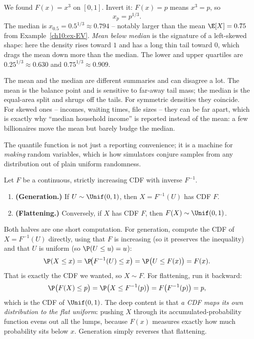 \begin{example}[Quantiles of $f=3x^2$]
\label{ch10:ex-quantile}
We found $F(x) = x^3$ on $[0,1]$. Invert it: $F(x)=p$ means $x^3 = p$, so
\[
  x_p = p^{1/3}.
\]
The median is $x_{0.5} = 0.5^{1/3} \approx 0.794$ -- notably larger than the mean
$\E[X]=0.75$ from Example~\ref{ch10:ex-EV}. \emph{Mean below median} is the signature
of a left-skewed shape: here the density rises toward $1$ and has a long thin tail
toward $0$, which drags the mean down more than the median. The lower and upper
quartiles are $0.25^{1/3}\approx 0.630$ and $0.75^{1/3}\approx 0.909$.
\end{example}

\begin{trapbox}
The mean and the median are different summaries and can disagree a lot. The mean is
the balance point and is sensitive to far-away tail mass; the median is the
equal-area split and shrugs off the tails. For symmetric densities they coincide.
For skewed ones -- incomes, waiting times, file sizes -- they can be far apart, which
is exactly why ``median household income'' is reported instead of the mean: a few
billionaires move the mean but barely budge the median.
\end{trapbox}

The quantile function is not just a reporting convenience; it is a machine for
\emph{making} random variables, which is how simulators conjure samples from any
distribution out of plain uniform randomness.

\begin{theorem}
\label{ch10:thm-pit}
Let $F$ be a continuous, strictly increasing CDF with inverse $F^{-1}$.
\begin{enumerate}
\item \textbf{(Generation.)} If $U \sim \Unif(0,1)$, then $X = F^{-1}(U)$ has CDF
      $F$.
\item \textbf{(Flattening.)} Conversely, if $X$ has CDF $F$, then $F(X) \sim
      \Unif(0,1)$.
\end{enumerate}
\end{theorem}

\begin{whybox}
Both halves are one short computation. For generation, compute the CDF of
$X = F^{-1}(U)$ directly, using that $F$ is increasing (so it preserves the
inequality) and that $U$ is uniform (so $\P(U \le u) = u$):
\[
  \P(X \le x) = \P\!\big(F^{-1}(U) \le x\big) = \P\big(U \le F(x)\big) = F(x).
\]
That is exactly the CDF we wanted, so $X \sim F$. For flattening, run it backward:
\[
  \P\big(F(X) \le p\big) = \P\big(X \le F^{-1}(p)\big) = F\big(F^{-1}(p)\big) = p,
\]
which is the CDF of $\Unif(0,1)$. The deep content is that \emph{a CDF maps its own
distribution to the flat uniform}: pushing $X$ through its accumulated-probability
function evens out all the lumps, because $F(x)$ measures exactly how much
probability sits below $x$. Generation simply reverses that flattening.
\end{whybox}

